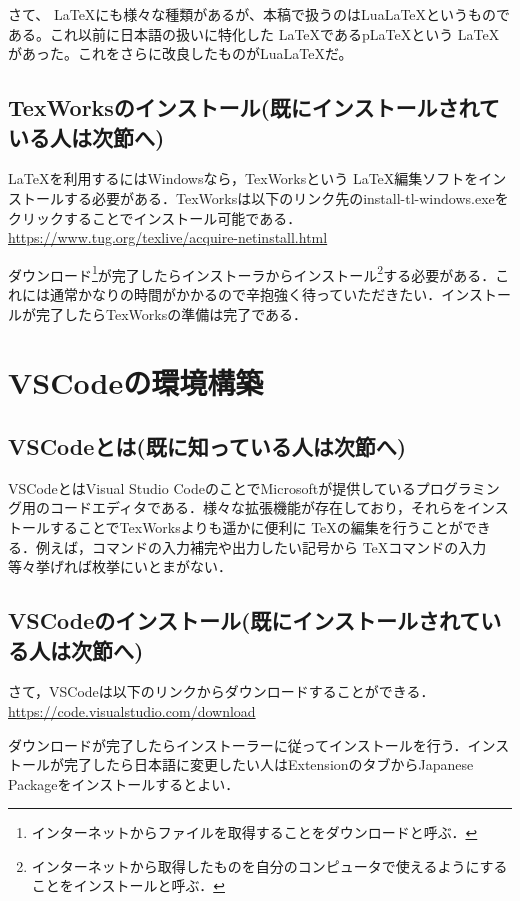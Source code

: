 \documentclass[]{ltjsarticle}
\begin{document}
  さて、 \LaTeX にも様々な種類があるが、本稿で扱うのはLua\LaTeX というものである。これ以前に日本語の扱いに特化した \LaTeX であるp\LaTeX という \LaTeX があった。これをさらに改良したものがLua\LaTeX だ。

  \subsection{TexWorksのインストール(既にインストールされている人は次節へ)}
  \LaTeX を利用するにはWindowsなら，TexWorksという \LaTeX 編集ソフトをインストールする必要がある．TexWorksは以下のリンク先のinstall-tl-windows.exeをクリックすることでインストール可能である．\\
  \url{https://www.tug.org/texlive/acquire-netinstall.html}
  
  ダウンロード\footnote{インターネットからファイルを取得することをダウンロードと呼ぶ．}が完了したらインストーラからインストール\footnote{インターネットから取得したものを自分のコンピュータで使えるようにすることをインストールと呼ぶ．}する必要がある．これには通常かなりの時間がかかるので辛抱強く待っていただきたい．インストールが完了したらTexWorksの準備は完了である．

  \section{VSCodeの環境構築}
  \subsection{VSCodeとは(既に知っている人は次節へ)}

  VSCodeとはVisual Studio CodeのことでMicrosoftが提供しているプログラミング用のコードエディタである．様々な拡張機能が存在しており，それらをインストールすることでTexWorksよりも遥かに便利に \TeX の編集を行うことができる．例えば，コマンドの入力補完や出力したい記号から \TeX コマンドの入力等々挙げれば枚挙にいとまがない．

  \subsection{VSCodeのインストール(既にインストールされている人は次節へ)}

  さて，VSCodeは以下のリンクからダウンロードすることができる．\\
  \url{https://code.visualstudio.com/download}

  ダウンロードが完了したらインストーラーに従ってインストールを行う．インストールが完了したら日本語に変更したい人はExtensionのタブからJapanese Packageをインストールするとよい．
\end{document}
